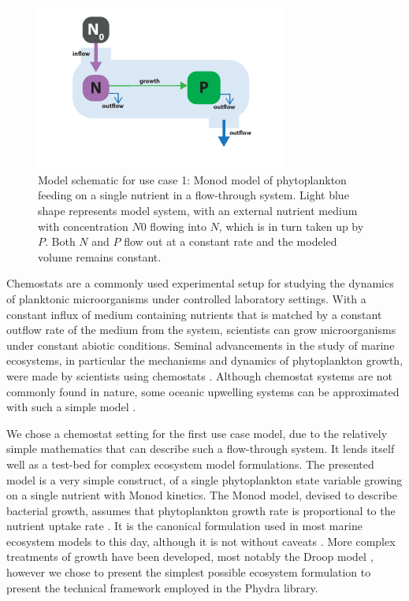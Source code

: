 \documentclass[journal abbreviation, manuscript]{copernicus}
\begin{document}
\begin{figure}[t]
\includegraphics[width=8.3cm]{Figures/firstdraft_schematics/01_schematics_Chemostat.pdf}
\caption{Model schematic for use case 1: Monod model of phytoplankton feeding on a single nutrient in a flow-through system. Light blue shape represents model system, with an external nutrient medium with concentration $N0$ flowing into $N$, which is in turn taken up by $P$. Both $N$ and $P$ flow out at a constant rate and the modeled volume remains constant.}
\label{Figure:ModelSchematics_1}
\end{figure}

Chemostats are a commonly used experimental setup for studying the dynamics of planktonic microorganisms under controlled laboratory settings. With a constant influx of medium containing nutrients that is matched by a constant outflow rate of the medium from the system, scientists can grow microorganisms under constant abiotic conditions. Seminal advancements in the study of marine ecosystems, in particular the mechanisms and dynamics of phytoplankton growth, were made by scientists using chemostats \citep[e.g.,][]{Droop1968VitaminLutheri}. Although chemostat systems are not commonly found in nature, some oceanic upwelling systems can be approximated with such a simple model \citep{Haefner2005ModelingApplications}.

We chose a chemostat setting for the first use case model, due to the relatively simple mathematics that can describe such a flow-through system. It lends itself well as a test-bed for complex ecosystem model formulations. The presented model is a very simple construct, of a single phytoplankton state variable growing on a single nutrient with Monod kinetics. The Monod model, devised to describe bacterial growth, assumes that phytoplankton growth rate is proportional to the nutrient uptake rate \citep{Monod1942RecherchesBacteriennes}.
It is the canonical formulation used in most marine ecosystem models to this day, although it is not without caveats \citep{Hellweger2017a}. More complex treatments of growth have been developed, most notably the Droop model \citep[e.g.,][]{Droop1968VitaminLutheri}, however we chose to present the simplest possible ecosystem formulation to present the technical framework employed in the Phydra library.
\end{document}
